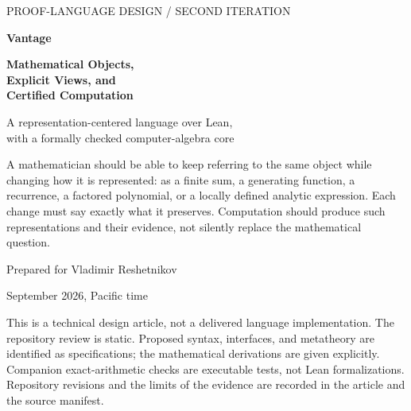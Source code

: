 \documentclass[11pt,a4paper]{article}
\theoremstyle{definition}
\begin{document}
\begin{titlepage}
{\sffamily\small\color{muted}PROOF-LANGUAGE DESIGN \quad / \quad SECOND ITERATION\par}
\vspace{19mm}
{\sffamily\bfseries\fontsize{38}{43}\selectfont\color{ink}Vantage\par}
\vspace{5mm}
{\sffamily\bfseries\fontsize{25}{31}\selectfont\color{ink}
Mathematical Objects,\\Explicit Views, and\\Certified Computation\par}
\vspace{10mm}
{\Large A representation-centered language over Lean,\\with a formally checked computer-algebra core\par}
\vspace{12mm}
\begin{designbox}
A mathematician should be able to keep referring to the same object while changing
how it is represented: as a finite sum, a generating function, a recurrence, a
factored polynomial, or a locally defined analytic expression. Each change must
say exactly what it preserves. Computation should produce such representations
and their evidence, not silently replace the mathematical question.
\end{designbox}
\vfill
{\large Prepared for Vladimir Reshetnikov\par}
{ September 2026, Pacific time\par}
\vspace{5mm}
{\small\color{muted}
This is a technical design article, not a delivered language implementation.
The repository review is static. Proposed syntax, interfaces, and metatheory are
identified as specifications; the mathematical derivations are given explicitly.
Companion exact-arithmetic checks are executable tests, not Lean formalizations.
Repository revisions and the limits of the evidence are recorded in the article
and the source manifest.}
\end{titlepage}
\end{document}
